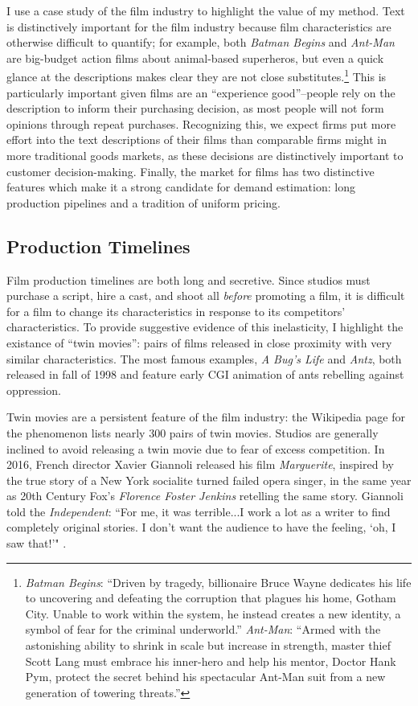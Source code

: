 \documentclass{article}
\begin{document}
I use a case study of the film industry to highlight the value of my method. Text is distinctively important for the film industry because film characteristics are otherwise difficult to quantify; for example, both \emph{Batman Begins} and \emph{Ant-Man} are big-budget action films about animal-based superheros, but even a quick glance at the descriptions makes clear they are not close substitutes.\footnote{\emph{Batman Begins}: ``Driven by tragedy, billionaire Bruce Wayne dedicates his life to uncovering and defeating the corruption that plagues his home, Gotham City. Unable to work within the system, he instead creates a new identity, a symbol of fear for the criminal underworld.'' \emph{Ant-Man}: ``Armed with the astonishing ability to shrink in scale but increase in strength, master thief Scott Lang must embrace his inner-hero and help his mentor, Doctor Hank Pym, protect the secret behind his spectacular Ant-Man suit from a new generation of towering threats.''} This is particularly important given films are an ``experience good''--people rely on the description to inform their purchasing decision, as most people will not form opinions through repeat purchases. Recognizing this, we expect firms put more effort into the text descriptions of their films than comparable firms might in more traditional goods markets, as these decisions are distinctively important to customer decision-making. Finally, the market for films has two distinctive features which make it a strong candidate for demand estimation: long production pipelines and a tradition of uniform pricing.

\subsection{Production Timelines}

Film production timelines are both long and secretive. Since studios must purchase a script, hire a cast, and shoot all \emph{before} promoting a film, it is difficult for a film to change its characteristics in response to its competitors' characteristics. To provide suggestive evidence of this inelasticity, I highlight the existance of ``twin movies'': pairs of films released in close proximity with very similar characteristics. The most famous examples, \emph{A Bug's Life} and \emph{Antz}, both released in fall of 1998 and feature early CGI animation of ants rebelling against oppression.

Twin movies are a persistent feature of the film industry: the Wikipedia page for the phenomenon lists nearly 300 pairs of twin movies. Studios are generally inclined to avoid releasing a twin movie due to fear of excess competition. In 2016, French director Xavier Giannoli released his film \emph{Marguerite}, inspired by the true story of a New York socialite turned failed opera singer, in the same year as 20th Century Fox's \emph{Florence Foster Jenkins} retelling the same story. Giannoli told the \emph{Independent}: ``For me, it was terrible...I work a lot as a writer to find completely original stories. I don't want the audience to have the feeling, `oh, I saw that!'" \parencite{mottram2016I}.
\end{document}
